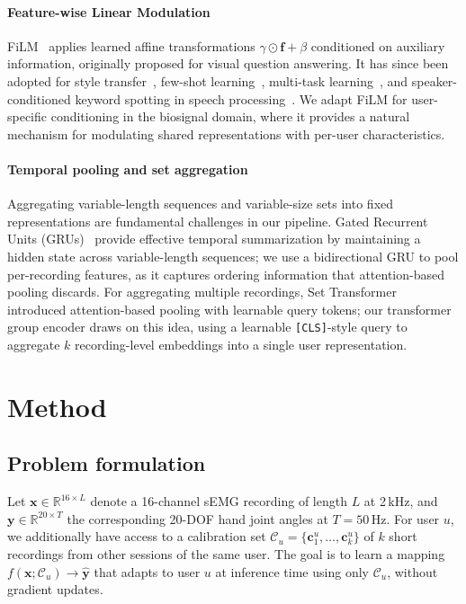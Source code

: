 \documentclass[conference]{IEEEtran}
\begin{document}
\paragraph{Feature-wise Linear Modulation}
FiLM~\cite{perez2018film} applies learned affine transformations $\gamma \odot \mathbf{f} + \beta$ conditioned on auxiliary information, originally proposed for visual question answering. It has since been adopted for style transfer~\cite{dumoulin2017learned}, few-shot learning~\cite{oreshkin2018tadam}, multi-task learning~\cite{strezoski2019many}, and speaker-conditioned keyword spotting in speech processing~\cite{labrador2025keyword}. We adapt FiLM for user-specific conditioning in the biosignal domain, where it provides a natural mechanism for modulating shared representations with per-user characteristics.

\paragraph{Temporal pooling and set aggregation}
Aggregating variable-length sequences and variable-size sets into fixed representations are fundamental challenges in our pipeline. Gated Recurrent Units (GRUs)~\cite{cho2014gru} provide effective temporal summarization by maintaining a hidden state across variable-length sequences; we use a bidirectional GRU to pool per-recording features, as it captures ordering information that attention-based pooling discards. For aggregating multiple recordings, Set Transformer~\cite{lee2019set} introduced attention-based pooling with learnable query tokens; our transformer group encoder draws on this idea, using a learnable \texttt{[CLS]}-style query to aggregate $k$ recording-level embeddings into a single user representation.

\section{Method}
\label{sec:method}

\subsection{Problem formulation}
\label{sec:formulation}

Let $\mathbf{x} \in \mathbb{R}^{16 \times L}$ denote a 16-channel sEMG recording of length $L$ at 2\,kHz, and $\mathbf{y} \in \mathbb{R}^{20 \times T}$ the corresponding 20-DOF hand joint angles at $T = 50$\,Hz. For user $u$, we additionally have access to a calibration set $\mathcal{C}_u = \{\mathbf{c}_1^u, \ldots, \mathbf{c}_k^u\}$ of $k$ short recordings from other sessions of the same user. The goal is to learn a mapping $f(\mathbf{x}; \mathcal{C}_u) \rightarrow \hat{\mathbf{y}}$ that adapts to user $u$ at inference time using only $\mathcal{C}_u$, without gradient updates.
\end{document}
